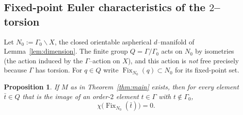 \documentclass[12pt]{article}
\newcommand{\Fix}{\operatorname{Fix}}
\newtheorem{proposition}{Proposition}
\theoremstyle{definition}
\begin{document}
\subsection{Fixed-point Euler characteristics of the $2$--torsion}

Let $N_0:=\Gamma_0\backslash X$, the closed orientable aspherical $d$--manifold of
Lemma~\ref{lem:dimension}.  The finite group $Q=\Gamma/\Gamma_0$ acts on $N_0$ by
isometries (the action induced by the $\Gamma$--action on $X$), and this action is
\emph{not} free precisely because $\Gamma$ has torsion.  For $q\in Q$ write
$\Fix_{N_0}(q)\subset N_0$ for its fixed-point set.

\begin{proposition}\label{prop:lefschetz}
If $M$ as in Theorem~\ref{thm:main} exists, then for every element $\bar t\in Q$
that is the image of an order-$2$ element $t\in\Gamma$ with $t\notin\Gamma_0$,
\[
   \chi\bigl(\Fix_{N_0}(\bar t)\bigr)=0 .
\]
\end{proposition}
\end{document}
